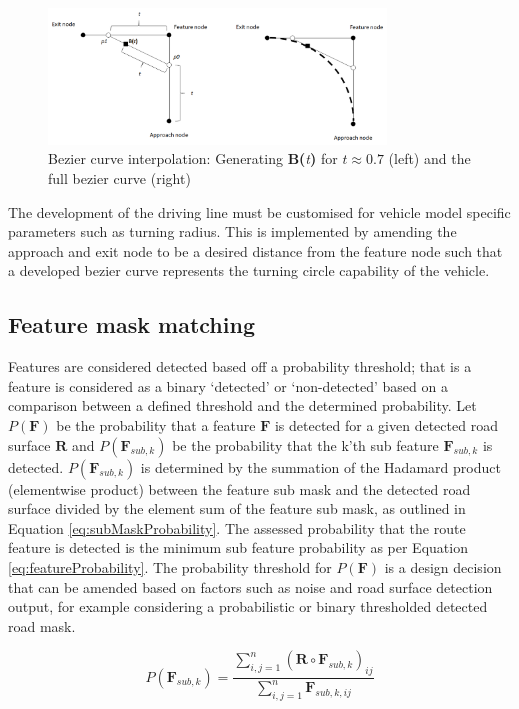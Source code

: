 \documentclass[]{aiaa-tc}%
\begin{document}
\begin{figure}
	\centering
	\includegraphics[width=0.8\textwidth]{bezier/quadraticBezier.png}
	\caption{Bezier curve interpolation: Generating \textbf{B(}\textit{t}\textbf{)} for $t\approx0.7$ (left) and the full bezier curve (right)}
	\label{f:quadraticBezier}
\end{figure}

The development of the driving line must be customised for vehicle model specific parameters such as turning radius. This is implemented by amending the approach and exit node to be a desired distance from the feature node such that a developed bezier curve represents the turning circle capability of the vehicle. 

\subsection{Feature mask matching} 

Features are considered detected based off a probability threshold; that is a feature is considered as a binary `detected' or `non-detected' based on a comparison between a defined threshold and the determined probability. Let $P(\textbf{F})$ be the probability that a feature $\textbf{F}$ is detected for a given detected road surface $\textbf{R}$ and $P(\textbf{F}_{sub,k})$ be the probability that the k'th sub feature $\textbf{F}_{sub,k}$ is detected. $P(\textbf{F}_{sub,k})$ is determined by the summation of the Hadamard product (elementwise product) between the feature sub mask and the detected road surface divided by the element sum of the feature sub mask, as outlined in Equation \ref{eq:subMaskProbability}. The assessed probability that the route feature is detected is the minimum sub feature probability as per Equation \ref{eq:featureProbability}. The probability threshold for $P(\textbf{F})$ is a design decision that can be amended based on factors such as noise and road surface detection output, for example considering a probabilistic or binary thresholded detected road mask.


\begin{equation}\label{eq:subMaskProbability}
	P(\textbf{F}_{sub,k}) = \frac{\sum_{i,j=1}^{n} (\textbf{R} \circ \textbf{F}_{sub,k})_{ij}}{\sum_{i,j=1}^{n} \textbf{F}_{sub,k,ij}}
\end{equation}
\end{document}
